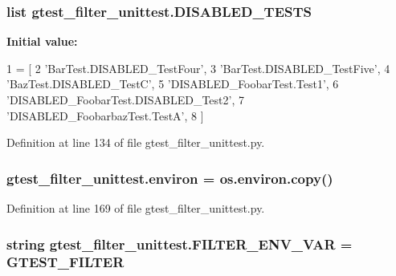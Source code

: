 \subsubsection[{\texorpdfstring{D\+I\+S\+A\+B\+L\+E\+D\+\_\+\+T\+E\+S\+TS}{DISABLED_TESTS}}]{\setlength{\rightskip}{0pt plus 5cm}list gtest\+\_\+filter\+\_\+unittest.\+D\+I\+S\+A\+B\+L\+E\+D\+\_\+\+T\+E\+S\+TS}\hypertarget{namespacegtest__filter__unittest_affe760ab1e8c4c7b61566076c37c1d69}{}\label{namespacegtest__filter__unittest_affe760ab1e8c4c7b61566076c37c1d69}
{\bfseries Initial value\+:}
\begin{DoxyCode}
1 = [
2     \textcolor{stringliteral}{'BarTest.DISABLED\_TestFour'},
3     \textcolor{stringliteral}{'BarTest.DISABLED\_TestFive'},
4     \textcolor{stringliteral}{'BazTest.DISABLED\_TestC'},
5     \textcolor{stringliteral}{'DISABLED\_FoobarTest.Test1'},
6     \textcolor{stringliteral}{'DISABLED\_FoobarTest.DISABLED\_Test2'},
7     \textcolor{stringliteral}{'DISABLED\_FoobarbazTest.TestA'},
8     ]
\end{DoxyCode}


Definition at line 134 of file gtest\+\_\+filter\+\_\+unittest.\+py.

\subsubsection[{\texorpdfstring{environ}{environ}}]{\setlength{\rightskip}{0pt plus 5cm}gtest\+\_\+filter\+\_\+unittest.\+environ = os.\+environ.\+copy()}\hypertarget{namespacegtest__filter__unittest_ab6940a12e110abdd8dea27039f4731ef}{}\label{namespacegtest__filter__unittest_ab6940a12e110abdd8dea27039f4731ef}


Definition at line 169 of file gtest\+\_\+filter\+\_\+unittest.\+py.

\subsubsection[{\texorpdfstring{F\+I\+L\+T\+E\+R\+\_\+\+E\+N\+V\+\_\+\+V\+AR}{FILTER_ENV_VAR}}]{\setlength{\rightskip}{0pt plus 5cm}string gtest\+\_\+filter\+\_\+unittest.\+F\+I\+L\+T\+E\+R\+\_\+\+E\+N\+V\+\_\+\+V\+AR = \textquotesingle{}G\+T\+E\+S\+T\+\_\+\+F\+I\+L\+T\+ER\textquotesingle{}}\hypertarget{namespacegtest__filter__unittest_a3dbe99165209787d4d138d30673c95f5}{}\label{namespacegtest__filter__unittest_a3dbe99165209787d4d138d30673c95f5}


